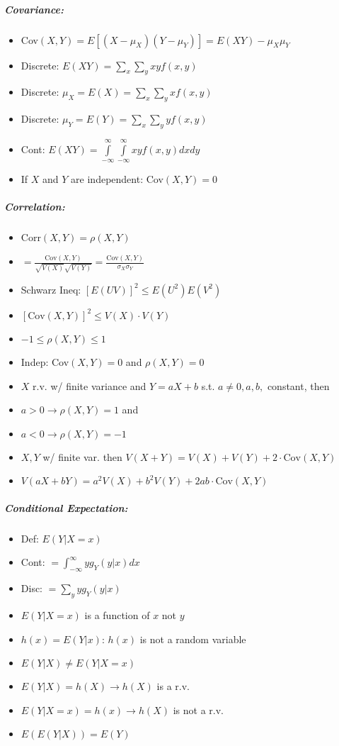 \documentclass[landscape,10pt]{article}
\begin{document}
\begin{multicols}{4}
\subparagraph*{Covariance: }
\begin{itemize}
    \item[] Cov\((X,Y) = E[(X-\mu_X)(Y-\mu_Y)] = E(XY) - \mu_X\mu_Y\)
    \item[] Discrete: \(E(XY) = \sum\limits_x\sum\limits_yxyf(x,y)\)
    \item[] Discrete: \(\mu_X = E(X) = \sum\limits_x\sum\limits_yxf(x,y)\)
    \item[] Discrete: \(\mu_Y = E(Y) = \sum\limits_x\sum\limits_yyf(x,y)\)
    \item[] Cont: \(E(XY) = \int\limits_{-\infty}^{\infty}\int\limits_{-\infty}^{\infty}{xyf(x,y)dxdy}\)
    \item[] If \(X\) and \(Y\) are independent: Cov\((X,Y) = 0\)
\end{itemize}
\subparagraph*{Correlation: }
\begin{itemize}
    \item[] Corr\((X,Y) = \rho(X,Y)\)
    \item[] \(= \frac{\text{Cov}(X,Y)}{\sqrt{V(X)}\sqrt{V(Y)}} =\frac{\text{Cov}(X,Y)}{\sigma_X \sigma_Y}\)
    \item[] Schwarz Ineq: \([E(UV)]^2 \leq E(U^2)E(V^2)\)
    \item[] \([\text{Cov}(X,Y)]^2 \leq V(X) \cdot V(Y)\)
    \item[] \( -1 \leq \rho(X,Y) \leq 1\)
    \item[] Indep: Cov\((X,Y) = 0\) and \(\rho(X,Y) = 0\)
    \item[] \(X\) r.v. w/ finite variance and \(Y = aX+b\) s.t. \(a \neq 0, a,b,\) constant, then
    \item[] \(a > 0 \rightarrow \rho(X,Y) = 1\) and
    \item[] \(a < 0 \rightarrow \rho(X,Y) = -1\)
    \item[] \(X,Y\) w/ finite var. then \(V(X+Y) = V(X)+V(Y) + 2\cdot \text{Cov}(X,Y)\)
    \item[] \(V(aX + bY) = a^2 V(X) + b^2 V(Y) + 2ab\cdot\text{Cov}(X,Y)\)
\end{itemize}

\subparagraph*{Conditional Expectation:}
\begin{itemize}
    \item[] Def: \(E(Y|X=x)\)
    \item[] Cont: \(= \int_{-\infty}^{\infty}{y g_Y(y|x)dx}\)
    \item[] Disc: \(= \sum_{y}{y g_Y(y|x)}\)
    \item[] \(E(Y|X=x)\) is a function of \(x\) not \(y\)
    \item[] \(h(x) = E(Y|x)\): \(h(x)\) is not a random variable
    \item[] \(E(Y|X) \neq E(Y|X=x)\)
    \item[] \(E(Y|X) = h(X) \rightarrow h(X)\) is a r.v.
    \item[] \(E(Y|X=x) = h(x) \rightarrow h(X)\) is not a r.v.
    \item[] \(E(E(Y|X)) = E(Y)\)
\end{itemize}


\end{multicols}
\end{document}
